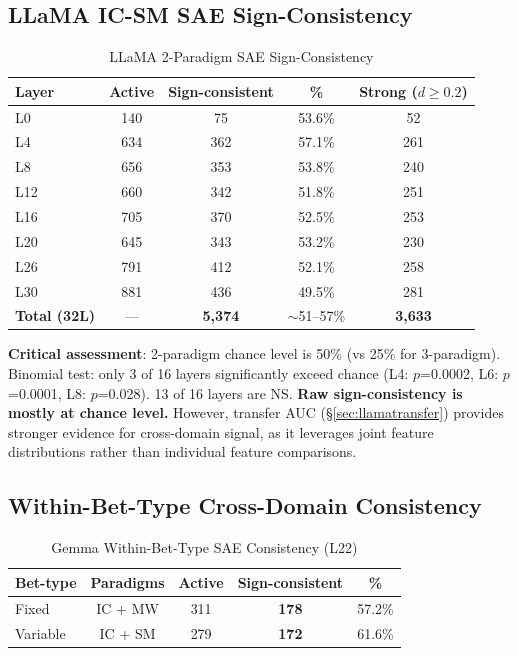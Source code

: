 \documentclass[11pt,a4paper]{article}
\begin{document}
\subsection{LLaMA IC-SM SAE Sign-Consistency}

\begin{table}[H]
\centering
\caption{LLaMA 2-Paradigm SAE Sign-Consistency}\label{tab:t17}
\footnotesize
\begin{tabular}{lcccc}
\toprule
Layer & Active & Sign-consistent & \% & Strong ($d\ge0.2$) \\
\midrule
L0  & 140 & 75  & 53.6\% & 52 \\
L4  & 634 & 362 & 57.1\% & 261 \\
L8  & 656 & 353 & 53.8\% & 240 \\
L12 & 660 & 342 & 51.8\% & 251 \\
L16 & 705 & 370 & 52.5\% & 253 \\
L20 & 645 & 343 & 53.2\% & 230 \\
L26 & 791 & 412 & 52.1\% & 258 \\
L30 & 881 & 436 & 49.5\% & 281 \\
\midrule
\textbf{Total (32L)} & --- & \textbf{5,374} & $\sim$51--57\% & \textbf{3,633} \\
\bottomrule
\end{tabular}
\end{table}

\noindent\textbf{Critical assessment}: 2-paradigm chance level is 50\% (vs 25\% for 3-paradigm). Binomial test: only 3 of 16 layers significantly exceed chance (L4: $p$=0.0002, L6: $p$=0.0001, L8: $p$=0.028). 13 of 16 layers are NS. \textbf{Raw sign-consistency is mostly at chance level.} However, transfer AUC (\S\ref{sec:llamatransfer}) provides stronger evidence for cross-domain signal, as it leverages joint feature distributions rather than individual feature comparisons.

\subsection{Within-Bet-Type Cross-Domain Consistency}

\begin{table}[H]
\centering
\caption{Gemma Within-Bet-Type SAE Consistency (L22)}\label{tab:t18}
\footnotesize
\begin{tabular}{lcccc}
\toprule
Bet-type & Paradigms & Active & Sign-consistent & \% \\
\midrule
Fixed    & IC + MW & 311 & \textbf{178} & 57.2\% \\
Variable & IC + SM & 279 & \textbf{172} & 61.6\% \\
\bottomrule
\end{tabular}
\end{table}
\end{document}
